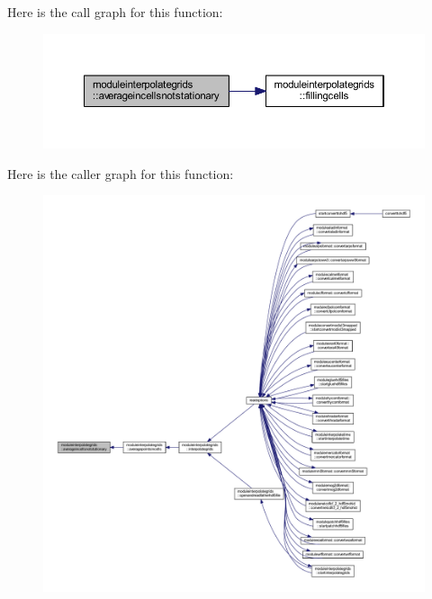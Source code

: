 Here is the call graph for this function\+:\nopagebreak
\begin{figure}[H]
\begin{center}
\leavevmode
\includegraphics[width=350pt]{namespacemoduleinterpolategrids_a74dfc196d632c6152816d265fcced032_cgraph}
\end{center}
\end{figure}
Here is the caller graph for this function\+:\nopagebreak
\begin{figure}[H]
\begin{center}
\leavevmode
\includegraphics[width=350pt]{namespacemoduleinterpolategrids_a74dfc196d632c6152816d265fcced032_icgraph}
\end{center}
\end{figure}
\mbox{\label{namespacemoduleinterpolategrids_a88091593ce71c7617aca77912135e4af}} 
